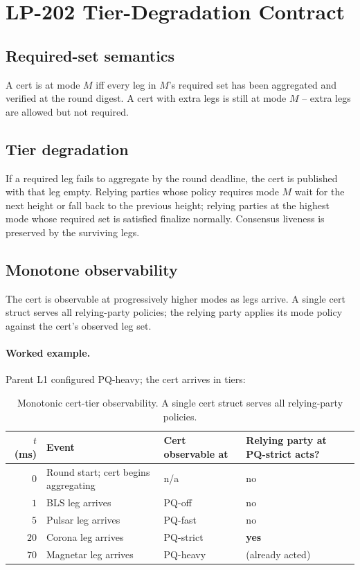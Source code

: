 \section{LP-202 Tier-Degradation Contract}

\subsection{Required-set semantics}

A cert is at mode $M$ iff every leg in $M$'s required set has been
aggregated and verified at the round digest. A cert with extra legs
is still at mode $M$ -- extra legs are allowed but not required.

\subsection{Tier degradation}

If a required leg fails to aggregate by the round deadline, the
cert is published with that leg empty. Relying parties whose policy
requires mode $M$ wait for the next height or fall back to the
previous height; relying parties at the highest mode whose required
set is satisfied finalize normally. Consensus liveness is preserved
by the surviving legs.

\subsection{Monotone observability}

The cert is observable at progressively higher modes as legs
arrive. A single cert struct serves all relying-party policies; the
relying party applies its mode policy against the cert's observed
leg set.

\paragraph{Worked example.} Parent L1 configured PQ-heavy; the cert
arrives in tiers:

\begin{table}[h]
\centering
\small
\begin{tabular}{@{}rp{4cm}p{3.5cm}p{4cm}@{}}
\toprule
\textbf{$t$ (ms)} & \textbf{Event} & \textbf{Cert observable at} & \textbf{Relying party at PQ-strict acts?} \\
\midrule
$0$ & Round start; cert begins aggregating & n/a & no \\
$1$ & BLS leg arrives & PQ-off & no \\
$5$ & Pulsar leg arrives & PQ-fast & no \\
$20$ & Corona leg arrives & PQ-strict & \textbf{yes} \\
$70$ & Magnetar leg arrives & PQ-heavy & (already acted) \\
\bottomrule
\end{tabular}
\caption{Monotonic cert-tier observability. A single cert struct
serves all relying-party policies.}
\label{tab:monotone}
\end{table}

